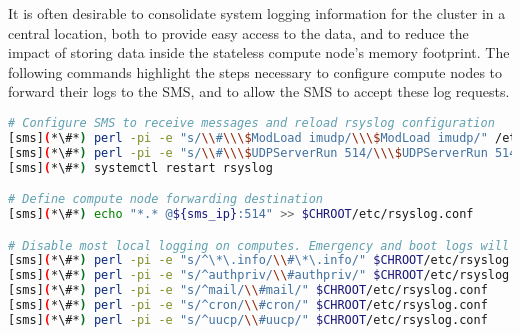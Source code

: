 It is often desirable to consolidate system logging information for the cluster in a
central location, both to provide easy access to the data, and to reduce the
impact of storing data inside the stateless compute node's memory footprint. The
following commands highlight the steps necessary to configure compute nodes to
forward their logs to the SMS, and to allow the SMS to accept these log requests.


\begin{lstlisting}[language=bash,keywords={}]
# Configure SMS to receive messages and reload rsyslog configuration
[sms](*\#*) perl -pi -e "s/\\#\\\$ModLoad imudp/\\\$ModLoad imudp/" /etc/rsyslog.conf
[sms](*\#*) perl -pi -e "s/\\#\\\$UDPServerRun 514/\\\$UDPServerRun 514/" /etc/rsyslog.conf
[sms](*\#*) systemctl restart rsyslog

# Define compute node forwarding destination
[sms](*\#*) echo "*.* @${sms_ip}:514" >> $CHROOT/etc/rsyslog.conf

# Disable most local logging on computes. Emergency and boot logs will remain on the compute nodes
[sms](*\#*) perl -pi -e "s/^\*\.info/\\#\*\.info/" $CHROOT/etc/rsyslog.conf
[sms](*\#*) perl -pi -e "s/^authpriv/\\#authpriv/" $CHROOT/etc/rsyslog.conf
[sms](*\#*) perl -pi -e "s/^mail/\\#mail/" $CHROOT/etc/rsyslog.conf
[sms](*\#*) perl -pi -e "s/^cron/\\#cron/" $CHROOT/etc/rsyslog.conf
[sms](*\#*) perl -pi -e "s/^uucp/\\#uucp/" $CHROOT/etc/rsyslog.conf

\end{lstlisting}
